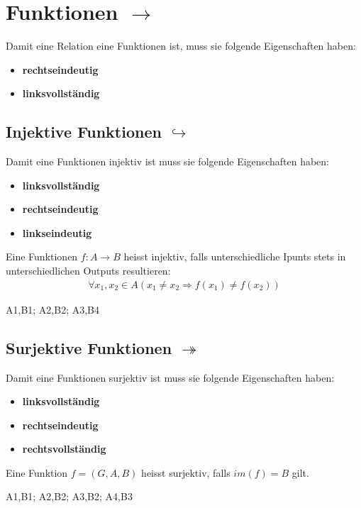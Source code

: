 \section{Funktionen $\rightarrow$}
Damit eine Relation eine Funktionen ist, muss sie folgende Eigenschaften haben:
\begin{itemize}
    \item \textbf{rechtseindeutig}
    \item \textbf{linksvollständig}
\end{itemize}
\subsection{Injektive Funktionen $\hookrightarrow$}
Damit eine Funktionen injektiv ist muss sie folgende Eigenschaften haben:
\begin{itemize}
    \item \textbf{linksvollständig}
    \item \textbf{rechtseindeutig}
    \item \textbf{linkseindeutig}
\end{itemize}
Eine Funktionen $f : A \rightarrow B$ heisst injektiv, falls unterschiedliche Ipunts stets in
unterschiedlichen Outputs resultieren:
\begin{align*}
    \forall{x_1, x_2} \in A(x_1 \neq x_2 \Rightarrow f(x_1) \neq f(x_2))
\end{align*}
\begin{center}
        {
        A1,B1;
        A2,B2;
        A3,B4
        }
    \injektiv{}
\end{center}
\subsection{Surjektive Funktionen $\twoheadrightarrow$}
Damit eine Funktionen surjektiv ist muss sie folgende Eigenschaften haben:
\begin{itemize}
    \item \textbf{linksvollständig}
    \item \textbf{rechtseindeutig}
    \item \textbf{rechtsvollständig}
\end{itemize}
Eine Funktion $f = (G,A,B)$ heisst surjektiv, falls $im(f) = B$ gilt.
\begin{center}
        {
        A1,B1;
        A2,B2;
        A3,B2;
        A4,B3
        }
    \surjektiv{}
\end{center}
